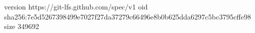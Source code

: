 version https://git-lfs.github.com/spec/v1
oid sha256:7e5d5267398499e7027f27da37279c66496e8b0b625dda6297c5bc3795cffe98
size 349692
